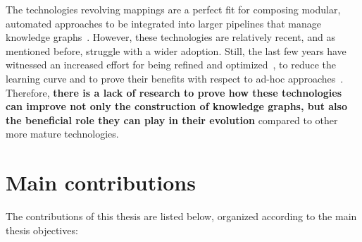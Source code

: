 The technologies revolving mappings are a perfect fit for composing modular, automated approaches to be integrated into larger pipelines that manage knowledge graphs~\citep{simsek2021knowledge,cimmino2022helio,grassi2023composable}. However, these technologies are relatively recent, and as mentioned before, struggle with a wider adoption. Still, the last few years have witnessed an increased effort for being refined and optimized~\citep{calvanese2017ontop,chaves2019parameters,arenas2022morphkgc,iglesias2023scaling}, to reduce the learning curve and to prove their benefits with respect to ad-hoc approaches~\citep{iglesias2019bio2rdf}. Therefore, \textbf{ there is a lack of research to prove how these technologies can improve not only the construction of knowledge graphs, but also the beneficial role they can play in their evolution} compared to other more mature technologies.  


\section{Main contributions}

The contributions of this thesis are listed below, organized according to the main thesis objectives:

